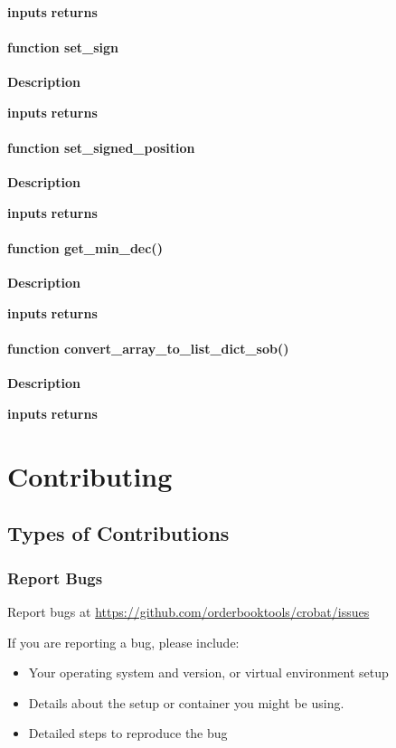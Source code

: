 \documentclass[refman]{article}
\begin{document}
\textbf{inputs}
\textbf{returns}

\paragraph{\textbf{function} set\_sign}\hfill\break
\noindent \textbf{Description}

\textbf{inputs}
\textbf{returns}

\paragraph{\textbf{function} set\_signed\_position}\hfill\break
\noindent \textbf{Description}

\textbf{inputs}
\textbf{returns}

\paragraph{\textbf{function} get\_min\_dec()}\hfill\break
\noindent \textbf{Description}

\textbf{inputs}
\textbf{returns}

\paragraph{\textbf{function} convert\_array\_to\_list\_dict\_sob()}\hfill\break
\noindent \textbf{Description}

\textbf{inputs}
\textbf{returns}

\newpage
\section{Contributing}
\subsection{Types of Contributions}
\subsubsection{Report Bugs}
Report bugs at \href{https://github.com/orderbooktools/crobat/issues}{https://github.com/orderbooktools/crobat/issues}
 
 If you are reporting a bug, please include:
 \begin{itemize}
 	\item Your operating system and version, or virtual environment setup
 	\item Details about the setup or container you might be using.
 	\item Detailed steps to reproduce the bug
 \end{itemize}
 
\end{document}
